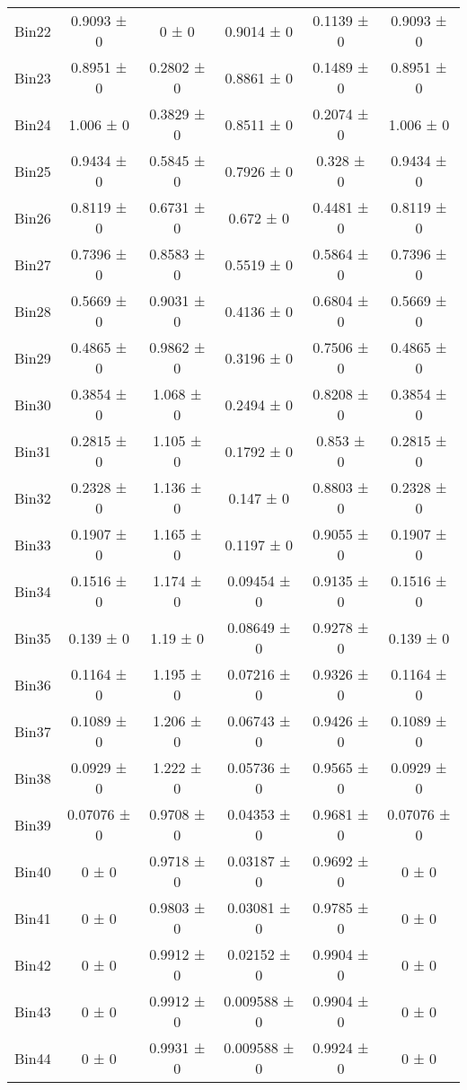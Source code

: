 \begin{tabular}{@{\extracolsep{4pt}}lccccc@{}}
     Bin22 & 0.9093 ± 0 & 0 ± 0 & 0.9014 ± 0 & 0.1139 ± 0 & 0.9093 ± 0 \\ 
     Bin23 & 0.8951 ± 0 & 0.2802 ± 0 & 0.8861 ± 0 & 0.1489 ± 0 & 0.8951 ± 0 \\ 
     Bin24 & 1.006 ± 0 & 0.3829 ± 0 & 0.8511 ± 0 & 0.2074 ± 0 & 1.006 ± 0 \\ 
     Bin25 & 0.9434 ± 0 & 0.5845 ± 0 & 0.7926 ± 0 & 0.328 ± 0 & 0.9434 ± 0 \\ 
     Bin26 & 0.8119 ± 0 & 0.6731 ± 0 & 0.672 ± 0 & 0.4481 ± 0 & 0.8119 ± 0 \\ 
     Bin27 & 0.7396 ± 0 & 0.8583 ± 0 & 0.5519 ± 0 & 0.5864 ± 0 & 0.7396 ± 0 \\ 
     Bin28 & 0.5669 ± 0 & 0.9031 ± 0 & 0.4136 ± 0 & 0.6804 ± 0 & 0.5669 ± 0 \\ 
     Bin29 & 0.4865 ± 0 & 0.9862 ± 0 & 0.3196 ± 0 & 0.7506 ± 0 & 0.4865 ± 0 \\ 
     Bin30 & 0.3854 ± 0 & 1.068 ± 0 & 0.2494 ± 0 & 0.8208 ± 0 & 0.3854 ± 0 \\ 
     Bin31 & 0.2815 ± 0 & 1.105 ± 0 & 0.1792 ± 0 & 0.853 ± 0 & 0.2815 ± 0 \\ 
     Bin32 & 0.2328 ± 0 & 1.136 ± 0 & 0.147 ± 0 & 0.8803 ± 0 & 0.2328 ± 0 \\ 
     Bin33 & 0.1907 ± 0 & 1.165 ± 0 & 0.1197 ± 0 & 0.9055 ± 0 & 0.1907 ± 0 \\ 
     Bin34 & 0.1516 ± 0 & 1.174 ± 0 & 0.09454 ± 0 & 0.9135 ± 0 & 0.1516 ± 0 \\ 
     Bin35 & 0.139 ± 0 & 1.19 ± 0 & 0.08649 ± 0 & 0.9278 ± 0 & 0.139 ± 0 \\ 
     Bin36 & 0.1164 ± 0 & 1.195 ± 0 & 0.07216 ± 0 & 0.9326 ± 0 & 0.1164 ± 0 \\ 
     Bin37 & 0.1089 ± 0 & 1.206 ± 0 & 0.06743 ± 0 & 0.9426 ± 0 & 0.1089 ± 0 \\ 
     Bin38 & 0.0929 ± 0 & 1.222 ± 0 & 0.05736 ± 0 & 0.9565 ± 0 & 0.0929 ± 0 \\ 
     Bin39 & 0.07076 ± 0 & 0.9708 ± 0 & 0.04353 ± 0 & 0.9681 ± 0 & 0.07076 ± 0 \\ 
     Bin40 & 0 ± 0 & 0.9718 ± 0 & 0.03187 ± 0 & 0.9692 ± 0 & 0 ± 0 \\ 
     Bin41 & 0 ± 0 & 0.9803 ± 0 & 0.03081 ± 0 & 0.9785 ± 0 & 0 ± 0 \\ 
     Bin42 & 0 ± 0 & 0.9912 ± 0 & 0.02152 ± 0 & 0.9904 ± 0 & 0 ± 0 \\ 
     Bin43 & 0 ± 0 & 0.9912 ± 0 & 0.009588 ± 0 & 0.9904 ± 0 & 0 ± 0 \\ 
     Bin44 & 0 ± 0 & 0.9931 ± 0 & 0.009588 ± 0 & 0.9924 ± 0 & 0 ± 0 \\ 

\end{tabular}
